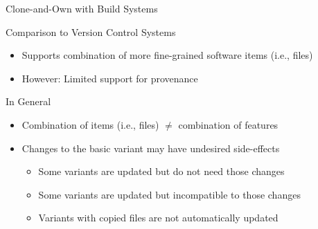 \begin{frame}{Clone-and-Own with Build Systems}
	\vspace{-\textheightoftitle}
	\begin{mycolumns}[b,animation=none]
		\begin{note}{Comparison to Version Control Systems}
			\begin{itemize}
				\item Supports combination of more fine-grained software items (i.e., files)
				\item However: Limited support for provenance
			\end{itemize}
		\end{note}
		\begin{note}{In General}
			\begin{itemize}
				\item Combination of items (i.e., files) $\neq$ combination of features
				\item Changes to the basic variant may have undesired side-effects
					\begin{itemize}
						\item Some variants are updated but do not need those changes
						\item Some variants are updated but incompatible to those changes
						\item Variants with copied files are not automatically updated
					\end{itemize}
			\end{itemize}
		\end{note}
	\mynextcolumn
		\centering{}
	\end{mycolumns}
\end{frame}
